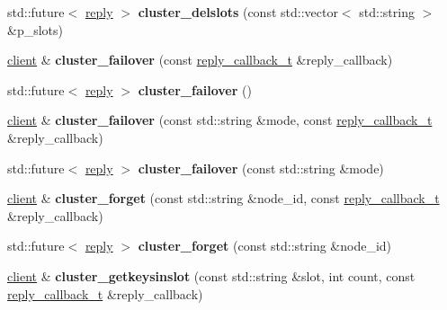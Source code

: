 \begin{DoxyCompactItemize}
std\+::future$<$ \hyperlink{classcpp__redis_1_1reply}{reply} $>$ {\bfseries cluster\+\_\+delslots} (const std\+::vector$<$ std\+::string $>$ \&p\+\_\+slots)
\item 
\mbox{\label{classcpp__redis_1_1client_a5afcee001e210150803a95c3d6412998}} 
\hyperlink{classcpp__redis_1_1client}{client} \& {\bfseries cluster\+\_\+failover} (const \hyperlink{classcpp__redis_1_1client_a061a1140d36d2eaeda82b09a0bb3f9f2}{reply\+\_\+callback\+\_\+t} \&reply\+\_\+callback)
\item 
\mbox{\label{classcpp__redis_1_1client_a76122bb138c12b90c78c4e511f45ef17}} 
std\+::future$<$ \hyperlink{classcpp__redis_1_1reply}{reply} $>$ {\bfseries cluster\+\_\+failover} ()
\item 
\mbox{\label{classcpp__redis_1_1client_a9c95de64e422c09c2180dc69db386d06}} 
\hyperlink{classcpp__redis_1_1client}{client} \& {\bfseries cluster\+\_\+failover} (const std\+::string \&mode, const \hyperlink{classcpp__redis_1_1client_a061a1140d36d2eaeda82b09a0bb3f9f2}{reply\+\_\+callback\+\_\+t} \&reply\+\_\+callback)
\item 
\mbox{\label{classcpp__redis_1_1client_a06f9c7d27f961787b01a01be95f1fa29}} 
std\+::future$<$ \hyperlink{classcpp__redis_1_1reply}{reply} $>$ {\bfseries cluster\+\_\+failover} (const std\+::string \&mode)
\item 
\mbox{\label{classcpp__redis_1_1client_aea8a77acb9031fd03f8ab5dc2c09a17d}} 
\hyperlink{classcpp__redis_1_1client}{client} \& {\bfseries cluster\+\_\+forget} (const std\+::string \&node\+\_\+id, const \hyperlink{classcpp__redis_1_1client_a061a1140d36d2eaeda82b09a0bb3f9f2}{reply\+\_\+callback\+\_\+t} \&reply\+\_\+callback)
\item 
\mbox{\label{classcpp__redis_1_1client_a58457400352dee764066bd9f737f667a}} 
std\+::future$<$ \hyperlink{classcpp__redis_1_1reply}{reply} $>$ {\bfseries cluster\+\_\+forget} (const std\+::string \&node\+\_\+id)
\item 
\mbox{\label{classcpp__redis_1_1client_a716e31987800e3ca5483f72972fecfb0}} 
\hyperlink{classcpp__redis_1_1client}{client} \& {\bfseries cluster\+\_\+getkeysinslot} (const std\+::string \&slot, int count, const \hyperlink{classcpp__redis_1_1client_a061a1140d36d2eaeda82b09a0bb3f9f2}{reply\+\_\+callback\+\_\+t} \&reply\+\_\+callback)

\end{DoxyCompactItemize}
